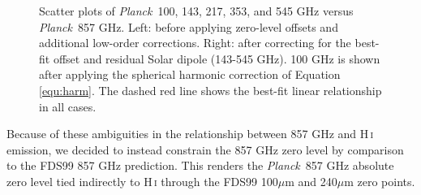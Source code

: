 \documentclass{emulateapj}
\newcommand{\PLANCK}{{\it Planck}}
\begin{document}
\begin{figure}
\begin{center}
\caption{\label{fig:dip}  Scatter plots of \PLANCK~100, 143, 217, 353, and 545 
GHz versus \PLANCK~857 GHz. Left: before applying zero-level offsets and 
additional low-order corrections. Right: after correcting for the best-fit 
offset and residual Solar dipole (143-545 GHz). 100 GHz is shown after applying
the spherical harmonic correction of Equation \ref{equ:harm}. The dashed red 
line shows the best-fit linear relationship in all cases.}
\end{center}
\end{figure}

\begin{figure*}
\begin{center}
\caption{\label{fig:harm} Summary of low-order corrections at 100 GHz. Left: 
prior to our low-order corrections, a $\sim$17$\mu$K zero-level offset is 
present and strong low-order problems reduce the linearity of the 100 GHz 
scatter versus 857 GHz. Center: scatter plot versus 857 GHz after applying the 
best-fit offset and residual Solar dipole corrections derived with Equation 
\ref{equ:dip} to \PLANCK~100 GHz. The correlation is strengthened, but remains
far less tight than for 143-545 GHz (see Figure \ref{fig:dip}, top four rows, 
right column). Right: after applying the spherical harmonic correction of
Equation \ref{equ:harm} to \PLANCK~100 GHz, the correlation versus 857 GHz is 
far more tightly linear than following the dipole correction.}
\end{center}
\end{figure*}

Because of these ambiguities in the relationship between 857 GHz and 
H\,\textsc{i} emission, we decided to instead constrain the 857 GHz zero level 
by comparison to the FDS99 857 GHz prediction. This renders the \PLANCK~857 GHz
absolute zero level tied indirectly to H\,\textsc{i} through the FDS99 
100$\mu$m and 240$\mu$m zero points. 
\end{document}
